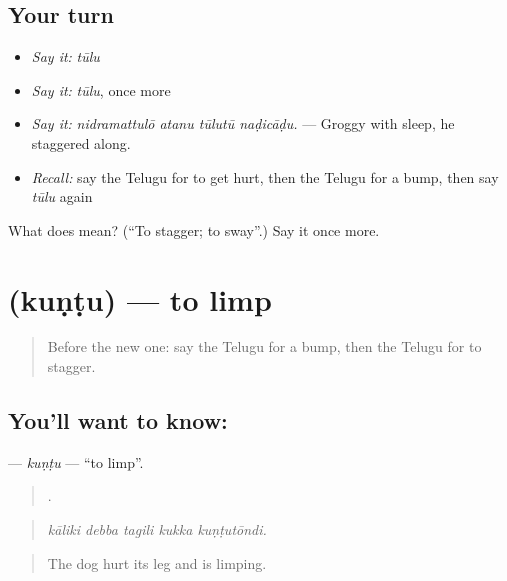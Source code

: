 \subsection*{Your turn}
\begin{itemize}
\raggedright
  \item \emph{Say it:} \emph{tūlu}
  \item \emph{Say it:} \emph{tūlu}, once more
  \item \emph{Say it:} \emph{nidramattulō atanu tūlutū naḍicāḍu.} — Groggy with sleep, he staggered along.
  \item \emph{Recall:} say the Telugu for to get hurt, then the Telugu for a bump, then say \emph{tūlu} again
\end{itemize}

\begin{tcolorbox}[breakable,colback=teal!4,colframe=teal!35!black,title={Before you move on}]
What does  mean? (\textquotedblleft{}To stagger; to sway\textquotedblright{}.) Say it once more.
\end{tcolorbox}
\section[\texorpdfstring{\te{కుంటు} (kuṇṭu)}{కుంటు (kuṇṭu)}]{ (kuṇṭu) — to limp}

\label{lesson:TE-C518-kuntu}



\begin{quote}
Before the new one: say the Telugu for a bump, then the Telugu for to stagger.
\end{quote}

\subsection*{You'll want to know: }
\textbf{} — \emph{kuṇṭu} — \textquotedblleft{}to limp\textquotedblright{}.

\begin{quote}
    .
\end{quote}

\begin{quote}
\emph{kāliki debba tagili kukka kuṇṭutōndi.}
\end{quote}

\begin{quote}
The dog hurt its leg and is limping.
\end{quote}

